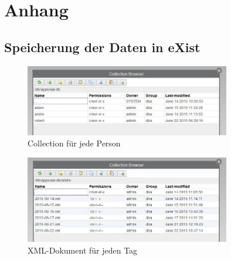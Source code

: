 \appendix

\section{Anhang}
\subsection{Speicherung der Daten in eXist}
\begin{figure}[H]
	\centering
		\includegraphics[width=0.8\textwidth]{images/collections1.jpg}
		\caption{Collection für jede Person} 
		\label{collection1}
	\centering
\end{figure}
\begin{figure}[H]
	\centering
		\includegraphics[width=0.8\textwidth]{images/collections2.jpg}
		\caption{XML-Dokument für jeden Tag} 
		\label{collection2}
	\centering
\end{figure}
